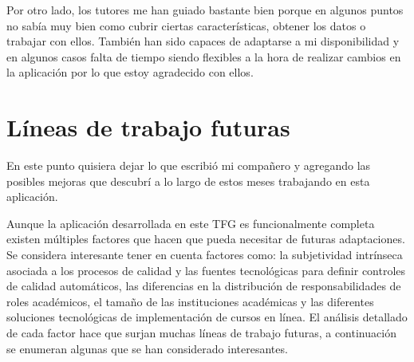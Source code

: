 Por otro lado, los tutores me han guiado bastante bien porque en algunos puntos no sabía muy bien como cubrir ciertas características, obtener los datos o trabajar con ellos. También han sido capaces de adaptarse a mi disponibilidad y en algunos casos falta de tiempo siendo flexibles a la hora de realizar cambios en la aplicación por lo que estoy agradecido con ellos.

\section{Líneas de trabajo futuras}
En este punto quisiera dejar lo que escribió mi compañero \cite{previotfg} y agregando las posibles mejoras que descubrí a lo largo de estos meses trabajando en esta aplicación.

Aunque la aplicación desarrollada en este TFG es funcionalmente completa existen múltiples factores que hacen que pueda necesitar de futuras adaptaciones. Se considera interesante tener en cuenta factores como: la subjetividad intrínseca asociada a los procesos de calidad y las fuentes tecnológicas para definir controles de calidad automáticos, las diferencias en la distribución de responsabilidades de roles académicos, el tamaño de las instituciones académicas y las diferentes soluciones tecnológicas de implementación de cursos en línea. El análisis detallado de cada factor hace que surjan muchas líneas de trabajo futuras, a continuación se enumeran algunas que se han considerado interesantes.
